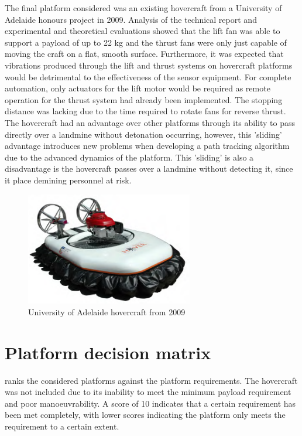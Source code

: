 \documentclass[main.tex]{subfiles}
\begin{document}
\begin{appendices}
The final platform considered was an existing hovercraft from a University of Adelaide honours project in 2009. Analysis of the technical report \parencite{hovercraft2009} and experimental and theoretical evaluations showed that the lift fan was able to support a payload of up to 22 kg and the thrust fans were only just capable of moving the craft on a flat, smooth surface. Furthermore, it was expected that vibrations produced through the lift and thrust systems on hovercraft platforms would be detrimental to the effectiveness of the sensor equipment. For complete automation, only actuators for the lift motor would be required as remote operation for the thrust system had already been implemented. The stopping distance was lacking due to the time required to rotate fans for reverse thrust. The hovercraft had an advantage over other platforms through its ability to pass directly over a landmine without detonation occurring, however, this 'sliding' advantage introduces new problems when developing a path tracking algorithm due to the advanced dynamics of the platform. This 'sliding' is also a disadvantage is the hovercraft passes over a landmine without detecting it, since it place demining personnel at risk.
\begin{figure}[ht]
\includegraphics[width=0.65\textwidth]{8-Appendices/HovercraftPic.png}
\centering
\caption[University of Adelaide hovercraft from 2009]{University of Adelaide hovercraft from 2009 \parencite{hovercraft2009}} 
\end{figure}

\section{Platform decision matrix}
 ranks the considered platforms against the platform requirements. The hovercraft was not included due to its inability to meet the minimum payload requirement and poor manoeuvrability. A score of 10 indicates that a certain requirement has been met completely, with lower scores indicating the platform only meets the requirement to a certain extent. 


\end{appendices}
\end{document}
